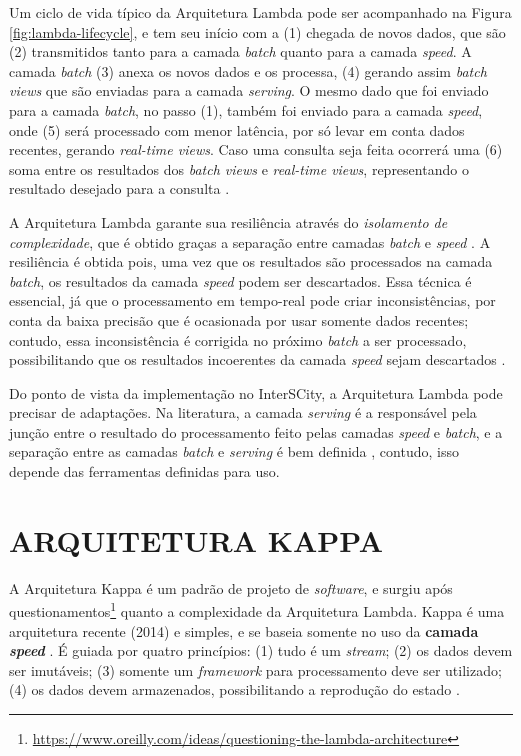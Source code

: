 Um ciclo de vida típico da Arquitetura Lambda pode ser acompanhado na Figura
\ref{fig:lambda-lifecycle}, e tem seu início com a (1) chegada
de novos dados, que são (2) transmitidos tanto para a camada
\textit{batch} quanto para a camada \textit{speed}. A camada \textit{batch}
(3) anexa os novos dados e os processa, (4) gerando assim
\textit{batch views} que são enviadas para a camada \textit{serving}. O mesmo
dado que foi enviado para a camada \textit{batch}, no passo (1), também foi
enviado para a camada \textit{speed}, onde (5) será processado com menor latência,
por só levar em conta dados recentes, gerando \textit{real-time views}. 
Caso uma consulta seja feita ocorrerá uma (6) soma entre os resultados
dos \textit{batch views} e \textit{real-time views}, representando o resultado
desejado para a consulta \cite{marz2015}.

A Arquitetura Lambda garante sua resiliência através do \textit{isolamento de
complexidade}, que é obtido graças a separação entre camadas \textit{batch}
e \textit{speed} \cite{marz2015}. A resiliência é obtida pois, uma vez que os
resultados são processados na camada \textit{batch}, os resultados da camada
\textit{speed} podem ser descartados. Essa técnica é essencial, já que o
processamento em tempo-real pode criar inconsistências, por conta da baixa
precisão que é ocasionada por usar somente dados recentes; contudo, essa
inconsistência é corrigida no próximo \textit{batch} a ser processado,
possibilitando que os resultados incoerentes da camada \textit{speed} sejam
descartados \cite{marz2015}.

Do ponto de vista da implementação no InterSCity, a Arquitetura Lambda pode
precisar de adaptações. Na literatura, a camada \textit{serving} é a responsável pela
junção entre o resultado do processamento feito pelas camadas \textit{speed} e
\textit{batch}, e a separação entre as camadas \textit{batch} e \textit{serving}
é bem definida \cite{marz2015}, contudo, isso depende das ferramentas
definidas para uso. 

\section{ARQUITETURA KAPPA}

A Arquitetura Kappa é um padrão de projeto de \textit{software}, e surgiu após
questionamentos\footnote{\url{https://www.oreilly.com/ideas/questioning-the-lambda-architecture}}
quanto a complexidade da Arquitetura Lambda. Kappa é uma arquitetura recente (2014) e
simples, e se baseia somente no uso da \textbf{camada \textit{speed}}
\cite{seyvet2016}. É guiada por quatro princípios: (1) tudo é um
\textit{stream}; (2) os dados devem ser imutáveis; (3) somente um
\textit{framework} para processamento deve ser utilizado; (4) os dados devem
armazenados, possibilitando a reprodução do estado \cite{seyvet2016}.

